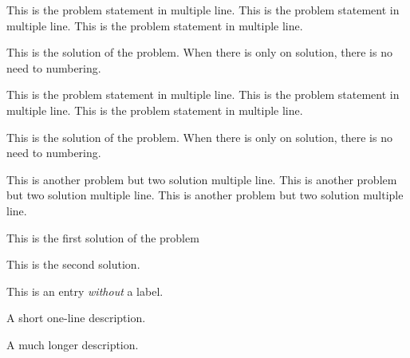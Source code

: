 \documentclass{article}
\begin{document}
\Problem This is the problem statement in multiple line. This is the
problem statement in multiple line. This is the problem statement in
multiple line.

\TheSolution This is the solution of the problem. When there is only on
solution, there is no need to numbering.

\Problem This is the problem statement in multiple line. This is the
problem statement in multiple line. This is the problem statement in
multiple line.

\Hint This is the solution of the problem. When there is only on
solution, there is no need to numbering.

\Problem This is another problem but two solution multiple line. This is
another problem but two solution multiple line. This is another problem
but two solution multiple line.

\ASolution This is the first solution of the problem

\ASolution This is the second solution.

\begin{description}
   \item This is an entry \textit{without} a label.
   \item[Something short] A short one-line description.
   \item[Something long] A much longer description. 
\end{description}
\end{document}
